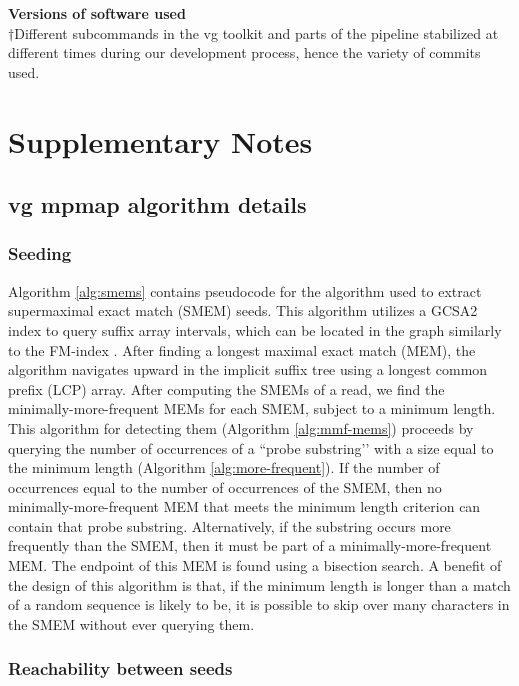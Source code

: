 \documentclass[11pt]{ucthesis}
\begin{document}
\begin{table}[H]
\caption{\textbf{Versions of software used}\\
$\dag$Different subcommands in the vg toolkit and parts of the pipeline stabilized at different times during our development process, hence the variety of commits used.}
\label{tab:versions}
\end{table}

\section{Supplementary Notes}

\subsection{vg mpmap algorithm details}

\subsubsection{Seeding}

Algorithm \ref{alg:smems} contains pseudocode for the algorithm used to extract supermaximal exact match (SMEM) seeds. This algorithm utilizes a GCSA2 index to query suffix array intervals, which can be located in the graph similarly to the FM-index \cite{siren2017indexing,ferragina2000opportunistic}. After finding a longest maximal exact match (MEM), the algorithm navigates upward in the implicit suffix tree using a longest common prefix (LCP) array.
After computing the SMEMs of a read, we find the minimally-more-frequent MEMs for each SMEM, subject to a minimum length. This algorithm for detecting them (Algorithm \ref{alg:mmf-mems}) proceeds by querying the number of occurrences of a “probe substring’’ with a size equal to the minimum length (Algorithm \ref{alg:more-frequent}). If the number of occurrences equal to the number of occurrences of the SMEM, then no minimally-more-frequent MEM that meets the minimum length criterion can contain that probe substring. Alternatively, if the substring occurs more frequently than the SMEM, then it must be part of a minimally-more-frequent MEM. The endpoint of this MEM is found using a bisection search. A benefit of the design of this algorithm is that, if the minimum length is longer than a match of a random sequence is likely to be, it is possible to skip over many characters in the SMEM without ever querying them.

\subsubsection{Reachability between seeds}
\end{document}

